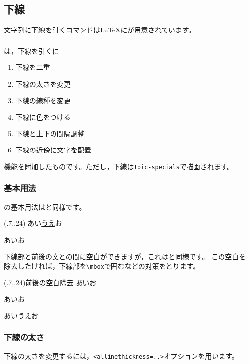 \subsection{下線}
文字列に下線を引くコマンドは\LaTeX にが用意されています。

\subsubsection{}
は，下線を引くに
\begin{jquote}
\begin{enumerate}[(1)]
  \item 下線を二重
  \item 下線の太さを変更
  \item 下線の線種を変更
  \item 下線に色をつける
  \item 下線と上下の間隔調整
  \item 下線の近傍に文字を配置
\end{enumerate}
\end{jquote}
機能を附加したものです。ただし，下線は\verb+tpic-specials+で描画されます。

\subsubsection{基本用法}
の基本用法はと同様です。

\begin{showEx}(.7,.24){}
あい\underline{うえ}お

あいお
\end{showEx}

下線部と前後の文との間に空白ができますが，これはと同様です。
この空白を除去したければ，下線部を\verb+\mbox+で囲むなどの対策をとります。

\begin{showEx}(.7,.24){前後の空白除去}
あいお

あい\mbox{}お

あいうえお
\end{showEx}

\subsubsection{下線の太さ}
下線の太さを変更するには，\verb+<allinethickness=..>+オプションを用います。

